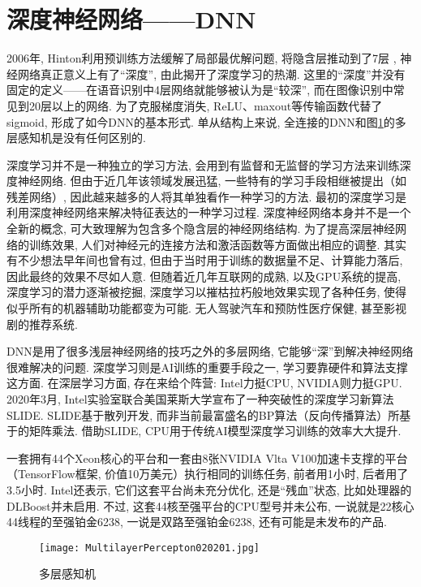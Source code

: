 \section{深度神经网络——DNN}
2006年, Hinton利用预训练方法缓解了局部最优解问题, 将隐含层推动到了7层 \cite{Hinton2006-9587}, 神经网络真正意义上有了“深度”, 由此揭开了深度学习的热潮. 这里的“深度”并没有固定的定义——在语音识别中4层网络就能够被认为是“较深”, 而在图像识别中常见到20层以上的网络. 为了克服梯度消失, ReLU、maxout等传输函数代替了sigmoid, 形成了如今DNN的基本形式. 单从结构上来说, 全连接的DNN和图\ref{MultilayerPercepton020201}的多层感知机是没有任何区别的.

深度学习并不是一种独立的学习方法, 会用到有监督和无监督的学习方法来训练深度神经网络.
但由于近几年该领域发展迅猛, 一些特有的学习手段相继被提出（如残差网络）, 因此越来越多的人将其单独看作一种学习的方法.
最初的深度学习是利用深度神经网络来解决特征表达的一种学习过程.
深度神经网络本身并不是一个全新的概念, 可大致理解为包含多个隐含层的神经网络结构. 为了提高深层神经网络的训练效果, 人们对神经元的连接方法和激活函数等方面做出相应的调整.
其实有不少想法早年间也曾有过, 但由于当时用于训练的数据量不足、计算能力落后, 因此最终的效果不尽如人意.
但随着近几年互联网的成熟, 以及GPU系统的提高, 深度学习的潜力逐渐被挖掘, 深度学习以摧枯拉朽般地效果实现了各种任务, 使得似乎所有的机器辅助功能都变为可能.
无人驾驶汽车和预防性医疗保健, 甚至影视剧的推荐系统.

DNN是用了很多浅层神经网络的技巧之外的多层网络, 它能够“深”到解决神经网络很难解决的问题.
深度学习则是AI训练的重要手段之一,  学习要靠硬件和算法支撑 这方面.
在深层学习方面, 存在来给个阵营: Intel力挺CPU, NVIDIA则力挺GPU.
2020年3月, Intel实验室联合美国莱斯大学宣布了一种突破性的深度学习新算法SLIDE.
SLIDE基于散列开发, 而非当前最富盛名的BP算法（反向传播算法）所基于的矩阵乘法.
借助SLIDE, CPU用于传统AI模型深度学习训练的效率大大提升.
\begin{exampleT}
一套拥有44个Xeon核心的平台和一套由8张NVIDIA Vlta V100加速卡支撑的平台（TensorFlow框架, 价值10万美元）执行相同的训练任务, 前者用1小时, 后者用了3.5小时.
Intel还表示, 它们这套平台尚未充分优化, 还是“残血”状态, 比如处理器的DLBoost并未启用.
不过, 这套44核至强平台的CPU型号并未公布, 一说就是22核心44线程的至强铂金6238, 一说是双路至强铂金6238, 还有可能是未发布的产品.
\end{exampleT}

\begin{figure}[H]
\centering
\texttt{[image: MultilayerPercepton020201.jpg]}
\caption{多层感知机}
\label{MultilayerPercepton020201}
\end{figure}

